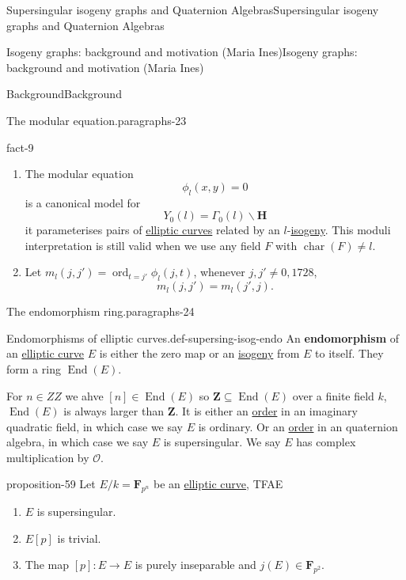 \documentclass[10pt,]{book}
\newcommand{\terminology}[1]{\textbf{#1}}
\numberwithin{equation}{section}
\newcommand{\lb}{[}
\newcommand{\rb}{]}
\newcommand{\ZZ}{\mathbf{Z}}
\newcommand{\HH}{\mathbf{H}}
\newcommand{\FF}{\mathbf{F}}
\newcommand{\ints}{\mathcal{O}}
\DeclareMathOperator{\End}{End}
\DeclareMathOperator{\characteristic}{char}
\DeclareMathOperator{\ord}{ord}
\begin{document}
\begin{chapterptx}{Supersingular isogeny graphs and Quaternion Algebras}{}{Supersingular isogeny graphs and Quaternion Algebras}{}{}
\begin{sectionptx}{Isogeny graphs: background and motivation (Maria Ines)}{}{Isogeny graphs: background and motivation (Maria Ines)}{}{}
\begin{subsectionptx}{Background}{}{Background}{}{}
\begin{paragraphs}{The modular equation.}{paragraphs-23}
\begin{fact}{}{}{fact-9}
\begin{enumerate}
\item\hypertarget{li-189}{}The modular equation%
\begin{equation*}
\phi_l (x,y) = 0
\end{equation*}
is a canonical model for%
\begin{equation*}
Y_0(l) = \Gamma_0(l) \backslash \HH
\end{equation*}
it parameterises pairs of \hyperref[def-supersing-isog-ec]{elliptic curves} related by an \(l\)-\hyperref[def-supersing-isog-isog]{isogeny}. This moduli interpretation is still valid when we use any field \(F\) with \(\characteristic(F) \ne l\).%
\item\hypertarget{li-190}{}Let \(m_l(j,j') = \ord_{t = j'} \phi_l(j,t)\), whenever \(j,j' \ne 0,1728\),%
\begin{equation*}
m_l(j,j') = m_l(j',j)\text{.}
\end{equation*}
%
\end{enumerate}
%
\end{fact}
\end{paragraphs}%
\begin{paragraphs}{The endomorphism ring.}{paragraphs-24}%
\begin{definition}{Endomorphisms of elliptic curves.}{def-supersing-isog-endo}%
\hypertarget{p-797}{}%
An \terminology{endomorphism} of an \hyperref[def-supersing-isog-ec]{elliptic curve} \(E\) is either the zero map or an \hyperref[def-supersing-isog-isog]{isogeny} from \(E\) to itself. They form a ring \(\End(E)\).%
\end{definition}
\hypertarget{p-798}{}%
For \(n \in ZZ\) we ahve \(\lb n \rb \in \End(E)\) so \(\ZZ \subseteq \End(E)\) over a finite field \(k\), \(\End(E)\) is always larger than \(\ZZ\). It is either an \hyperref[def-order-quaternion]{order} in an imaginary quadratic field, in which case we say \(E\) is ordinary. Or an \hyperref[def-order-quaternion]{order} in an quaternion algebra, in which case we say \(E\) is supersingular. We say \(E\) has complex multiplication by \(\ints\).%
\begin{proposition}{}{}{proposition-59}%
\hypertarget{p-799}{}%
Let \(E/k = \FF_{p^n}\) be an \hyperref[def-supersing-isog-ec]{elliptic curve}, TFAE\leavevmode%
\begin{enumerate}
\item\hypertarget{li-191}{}\(E\) is supersingular.%
\item\hypertarget{li-192}{}\(E\lb p\rb\) is trivial.%
\item\hypertarget{li-193}{}The map \(\lb p\rb \colon E\to E\) is purely inseparable and \(j(E) \in \FF_{p^2}\).%

\end{enumerate}
\end{proposition}
\end{paragraphs}
\end{subsectionptx}
\end{sectionptx}
\end{chapterptx}
\end{document}
